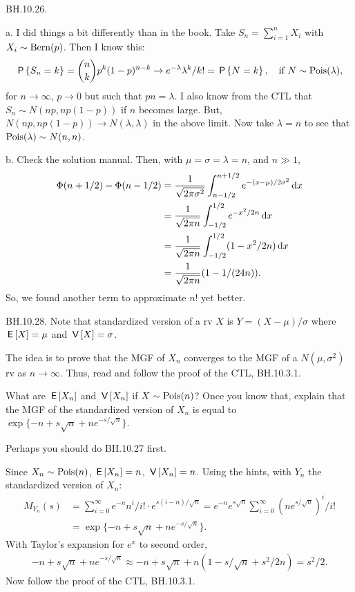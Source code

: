\begin{exercise}
BH.10.26.
\begin{solution}
a.
I did things a bit differently than in the book. Take $S_n=\sum_{i=1}^n X_i$ with $X_i\sim\mathrm{Bern}(p)$. Then I know this:
\begin{align*}
\,\mathsf{P}\left\{S_n=k\right\} = {n \choose k} p^k(1-p)^{n-k} \to e^{-\lambda} \lambda^k/k! = \,\mathsf{P}\left\{N=k\right\}, \quad\text{if } N\sim\mathrm{Pois}(\lambda),
\end{align*}
for $n\to \infty$, $p\to0$ but such that $p n = \lambda$.
I also know from the CTL that $S_n\sim N(n p, n p(1-p))$ if $n$ becomes large.
But, $N(n p, n p(1-p)) \to N(\lambda, \lambda)$ in the above limit.
Now take $\lambda=n$ to see that $\mathrm{Pois}(\lambda) \sim N(n,n)$.

b.
Check the solution manual. Then, with $\mu=\sigma=\lambda=n$, and $n\gg 1$,
\begin{align*}
\Phi(n+1/2) - \Phi(n-1/2)
&= \frac 1 {\sqrt{2\pi \sigma^{2}}}\int_{n-1/2}^{n+1/2} e^{-(x-\mu)/2\sigma^{2}} \,\textrm{d}x\\
&= \frac 1 {\sqrt{2\pi n }}\int_{-1/2}^{1/2} e^{-x^{2}/2n} \,\textrm{d}x\\
&= \frac 1 {\sqrt{2\pi n }}\int_{-1/2}^{1/2} (1 - x^{2}/2n) \,\textrm{d}x\\
&= \frac 1 {\sqrt{2\pi n }} (1- 1/(24 n)).
\end{align*}
So, we found another term to approximate $n!$ yet better.
\end{solution}
\end{exercise}



\begin{exercise}
BH.10.28. Note that standardized version of a rv $X$ is $Y=(X-\mu)/\sigma$ where $\,\mathsf{E}\left[X\right] = \mu$ and $\,\mathsf{V}\left[X\right] = \sigma$.
\begin{hint}
The idea is to prove that the MGF of $X_n$ converges to the MGF of a $N(\mu, \sigma^{2})$ rv as $n\to\infty$. Thus, read and follow the proof of the CTL, BH.10.3.1.

What are  $\,\mathsf{E}\left[X_n\right]$ and $\,\mathsf{V}\left[X_n\right]$ if $X\sim \mathrm{Pois}(n)$?  Once you know that, explain that the MGF of the standardized version of $X_n$ is equal to  $\exp\{-n+s \sqrt n + n e^{-s/\sqrt n}\}$.

Perhaps you should do BH.10.27 first.
\end{hint}
\begin{solution}
Since $X_n\sim \mathrm{Pois}(n)$, $\,\mathsf{E}\left[X_n\right]=n$, $\,\mathsf{V}\left[X_n\right]=n$. Using the hints, with $Y_{n}$ the standardized version of $X_n$:
\begin{align*}
M_{Y_n}(s) &= \sum_{i=0}^{\infty} e^{-n} n^i/i!\cdot e^{s (i-n)/\sqrt n}
= e^{-n} e^{s\sqrt n} \sum_{i=0}^{\infty}  (ne^{s/\sqrt n})^i/i!\\
&= \exp\{-n+s \sqrt n + n e^{-s/\sqrt n}\}.
\end{align*}
With Taylor's expansion for $e^x$ to second order,
\begin{align*}
-n+s \sqrt n + n e^{-s/\sqrt n} \approx -n+s \sqrt n + n \left(1 -s/\sqrt n + s^{2}/2 n\right) =   s^2/2.
\end{align*}
Now follow the proof of the CTL, BH.10.3.1.
\end{solution}
\end{exercise}


